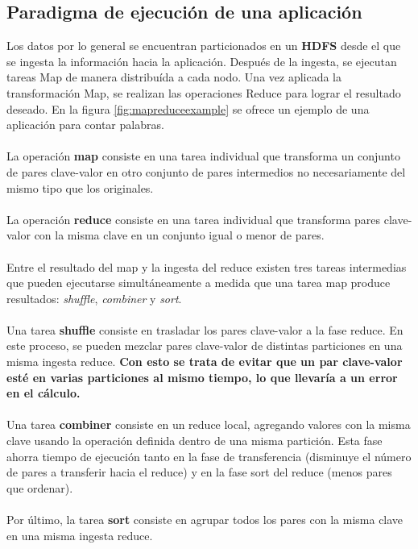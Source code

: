 \subsection{Paradigma de ejecución de una aplicación}
Los datos por lo general se encuentran particionados en un \textbf{HDFS} desde el que se ingesta la información hacia la aplicación. Después de la ingesta, se ejecutan tareas Map de manera distribuída a cada nodo. Una vez aplicada la transformación Map, se realizan las operaciones Reduce para lograr el resultado deseado. En la figura \ref{fig:mapreduceexample} se ofrece un ejemplo de una aplicación para contar palabras.\\\\
La operación \textbf{map} consiste en una tarea individual que transforma un conjunto de pares clave-valor en otro conjunto de pares intermedios no necesariamente del mismo tipo que los originales.\\\\
La operación \textbf{reduce} consiste en una tarea individual que transforma pares clave-valor con la misma clave en un conjunto igual o menor de pares.\\\\
Entre el resultado del map y la ingesta del reduce existen tres tareas intermedias que pueden ejecutarse simultáneamente a medida que una tarea map produce resultados: \textit{shuffle}, \textit{combiner} y \textit{sort}.\\\\
Una tarea \textbf{shuffle} consiste en trasladar los pares clave-valor a la fase reduce. En este proceso, se pueden mezclar pares clave-valor de distintas particiones en una misma ingesta reduce. \textbf{Con esto se trata de evitar que un par clave-valor esté en varias particiones al mismo tiempo, lo que llevaría a un error en el cálculo.}\\\\
Una tarea \textbf{combiner} consiste en un reduce local, agregando valores con la misma clave usando la operación definida dentro de una misma partición. Esta fase ahorra tiempo de ejecución tanto en la fase de transferencia (disminuye el número de pares a transferir hacia el reduce) y en la fase sort del reduce (menos pares que ordenar).\\\\
Por último, la tarea \textbf{sort} consiste en agrupar todos los pares con la misma clave en una misma ingesta reduce.
